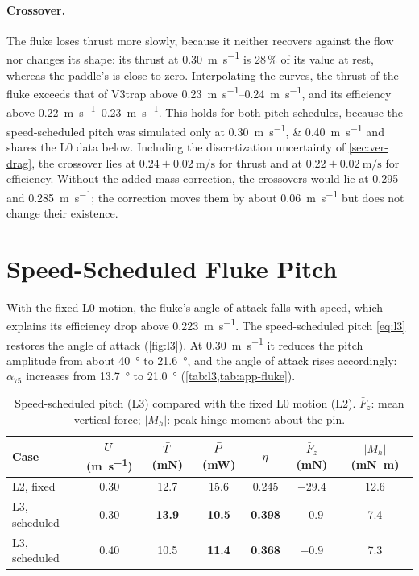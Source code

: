 \paragraph{Crossover.} The fluke loses thrust more slowly, because it neither recovers against the flow nor changes its shape:
its thrust at \SI{0.30}{\metre\per\second} is 28\,\% of its value at rest, whereas the paddle's is close to zero. Interpolating the
curves, the thrust of the fluke exceeds that of V3trap above \SIrange{0.23}{0.24}{\metre\per\second}, and its efficiency above
\SIrange{0.22}{0.23}{\metre\per\second}. This holds for both pitch schedules, because the speed-scheduled pitch was simulated only at \SIlist{0.30;0.40}{\metre\per\second} and shares the L0 data below. Including the discretization uncertainty of
\cref{sec:ver-drag}, the crossover lies at $0.24\pm\SI{0.02}{\metre\per\second}$ for thrust and at $0.22\pm\SI{0.02}{\metre\per\second}$
for efficiency. Without the added-mass correction, the crossovers would lie at \SI{0.295}{} and \SI{0.285}{\metre\per\second}; the
correction moves them by about \SI{0.06}{\metre\per\second} but does not change their existence.

\section{Speed-Scheduled Fluke Pitch}
\label{sec:res-l3}

With the fixed L0 motion, the fluke's angle of attack falls with speed, which explains its efficiency drop above
\SI{0.223}{\metre\per\second}. The speed-scheduled pitch \eqref{eq:l3} restores the angle of attack
(\cref{fig:l3}). At \SI{0.30}{\metre\per\second} it reduces the pitch amplitude from about \SI{40}{\degree} to
\SI{21.6}{\degree}, and the angle of attack rises accordingly: $\alpha_{75}$ increases from \SI{13.7}{\degree} to \SI{21.0}{\degree}
(\cref{tab:l3,tab:app-fluke}).

\begin{table}[t]
  \centering
  \caption[Speed-scheduled pitch]{Speed-scheduled pitch (L3) compared with the fixed L0 motion (L2). $\bar F_z$: mean vertical
    force; $|M_h|$: peak hinge moment about the pin.}
  \label{tab:l3}
  \small
  \begin{tabular}{@{}lcccccc@{}}
    \toprule
    Case & $U$ (\si{\metre\per\second}) & $\bar{T}$ (mN) & $\bar{P}$ (mW) & $\eta$ & $\bar F_z$ (mN) & $|M_h|$ (\si{\milli\newton\metre}) \\
    \midrule
    L2, fixed & 0.30 & 12.7 & 15.6 & 0.245 & $-29.4$ & 12.6 \\
    L3, scheduled & 0.30 & \textbf{13.9} & \textbf{10.5} & \textbf{0.398} & $-0.9$ & 7.4 \\
    L3, scheduled & 0.40 & 10.5 & \textbf{11.4} & \textbf{0.368} & $-0.9$ & 7.3 \\
    \bottomrule
  \end{tabular}
\end{table}

